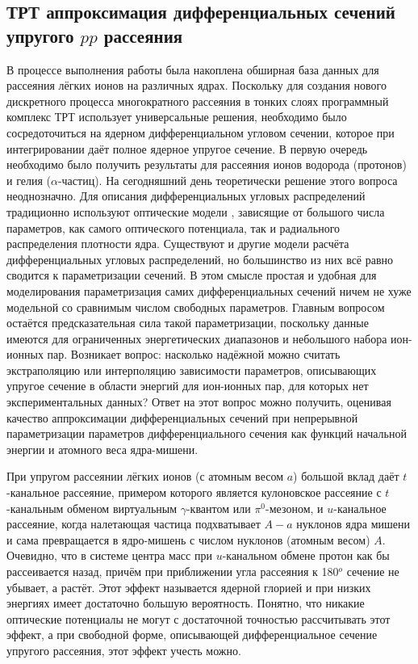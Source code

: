 \documentclass[a4paper,12pt]{article}
\begin{document}
\begin{large}
\subsection{ТРТ аппроксимация дифференциальных сечений упругого $pp$ рассеяния}
\label{subPol0}

  В процессе выполнения работы была накоплена обширная база данных для рассеяния лёгких ионов на различных ядрах.
  Поскольку для создания нового дискретного процесса многократного рассеяния в тонких слоях программный комплекс ТРТ использует универсальные решения, необходимо было сосредоточиться на ядерном дифференциальном угловом сечении, которое при интегрировании даёт полное ядерное упругое сечение.
  В первую очередь необходимо было получить результаты для рассеяния ионов водорода (протонов) и гелия ($\alpha$-частиц).
  На сегодняшний день теоретически решение этого вопроса неоднозначно.
  Для описания дифференциальных угловых распределений традиционно используют оптические модели \cite{Sys_pA}, зависящие от большого числа параметров, как самого оптического потенциала, так и радиального распределения плотности ядра.
  Существуют и другие модели расчёта дифференциальных угловых распределений, но большинство из них всё равно сводится к параметризации сечений.
  В этом смысле простая и удобная для моделирования параметризация самих дифференциальных сечений ничем не хуже модельной со сравнимым числом свободных параметров.
  Главным вопросом остаётся предсказательная сила такой параметризации, поскольку данные имеются для ограниченных энергетических диапазонов и небольшого набора ион-ионных пар.
  Возникает вопрос: насколько надёжной можно считать экстраполяцию или интерполяцию зависимости параметров, описывающих упругое сечение в области энергий для ион-ионных пар, для которых нет экспериментальных данных?
  Ответ на этот вопрос можно получить, оценивая качество аппроксимации дифференциальных сечений при непрерывной параметризации параметров дифференциального сечения как функций начальной энергии и атомного веса ядра-мишени.

  При упругом рассеянии лёгких ионов (с атомным весом $a$) большой вклад даёт $t$-канальное рассеяние, примером которого является кулоновское рассеяние с $t$-канальным обменом виртуальным $\gamma$-квантом или $\pi^0$-мезоном, и $u$-канальное рассеяние, когда налетающая частица подхватывает $A-a$ нуклонов ядра мишени и сама превращается в ядро-мишень с числом нуклонов (атомным весом) $A$.
  Очевидно, что в системе центра масс при $u$-канальном обмене протон как бы рассеивается назад, причём при приближении угла рассеяния к 180$^o$ сечение не убывает, а растёт.
  Этот эффект называется ядерной глорией \cite{NuclGlor} и при низких энергиях имеет достаточно большую вероятность.
  Понятно, что никакие оптические потенциалы не могут с достаточной точностью рассчитывать этот эффект, а при свободной форме, описывающей дифференциальное сечение упругого рассеяния, этот эффект учесть можно.


\end{large}
\end{document}
